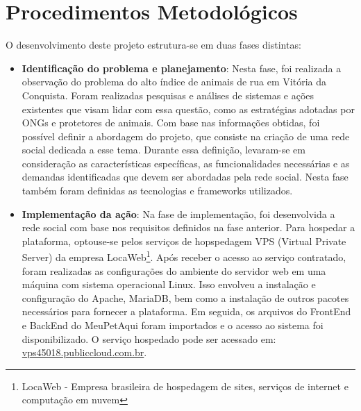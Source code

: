 \section{Procedimentos Metodológicos}
\label{sec:DescricaoIntervencao}
 
O desenvolvimento deste projeto estrutura-se em duas fases distintas:
\begin{itemize}

\item \textbf{Identificação do problema e planejamento}: Nesta fase, foi realizada a observação do problema do alto índice de animais de rua em Vitória da Conquista. Foram realizadas pesquisas e análises de sistemas e ações existentes que visam lidar com essa questão, como as estratégias adotadas por ONGs e protetores de animais. Com base nas informações obtidas, foi possível definir a abordagem do projeto, que consiste na criação de uma rede social dedicada a esse tema. Durante essa definição, levaram-se em consideração as características específicas, as funcionalidades necessárias e as demandas identificadas que devem ser abordadas pela rede social. Nesta fase também foram definidas as tecnologias e frameworks utilizados.
\item \textbf{Implementação da ação}: Na fase de implementação, foi desenvolvida a rede social com base nos requisitos definidos na fase anterior. Para hospedar a plataforma, optouse-se pelos serviços de hopspedagem \gls{VPS} (Virtual Private Server) da empresa LocaWeb\footnote{LocaWeb - Empresa brasileira de hospedagem de sites, serviços de internet e computação em nuvem}. Após receber o acesso ao serviço contratado, foram realizadas as configurações do ambiente do servidor web em uma máquina com sistema operacional Linux. Isso envolveu a instalação e configuração do Apache, MariaDB, bem como a instalação de outros pacotes necessários para fornecer a plataforma. Em seguida, os arquivos do FrontEnd e BackEnd do MeuPetAqui foram importados e o acesso ao sistema foi disponibilizado. O serviço hospedado pode ser acessado em: \href{http://vps45018.publiccloud.com.br/app/}{vps45018.publiccloud.com.br}.
\end{itemize}

\newpage
